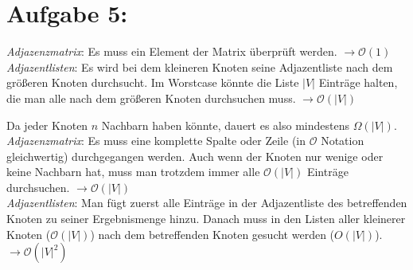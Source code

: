 \documentclass[11pt]{scrartcl} %
\begin{document}
\section*{Aufgabe 5:}
\begin{compactenum}[(a)]
\item
\emph{Adjazenzmatrix}: Es muss ein Element der Matrix überprüft werden. $\rightarrow \mathcal O(1)$\\[0.1cm]
\emph{Adjazentlisten}: Es wird bei dem kleineren Knoten seine Adjazentliste nach dem größeren Knoten durchsucht. Im Worstcase könnte die Liste $|V|$ Einträge halten, die man alle nach dem größeren Knoten durchsuchen muss. $\rightarrow \mathcal O(|V|)$\\
\item
Da jeder Knoten $n$ Nachbarn haben könnte, dauert es also mindestens $\Omega(|V|)$.\\[0.2cm]
\emph{Adjazenzmatrix}: Es muss eine komplette Spalte oder Zeile (in $\mathcal O$ Notation gleichwertig) durchgegangen werden. Auch wenn der Knoten nur wenige oder keine Nachbarn hat, muss man trotzdem immer alle $\mathcal O(|V|)$ Einträge durchsuchen. $\rightarrow \mathcal O(|V|)$\\[0.1cm]
\emph{Adjazentlisten}: Man fügt zuerst alle Einträge in der Adjazentliste des betreffenden Knoten zu seiner Ergebnismenge hinzu. Danach muss in den Listen aller kleinerer Knoten ($\mathcal O(|V|)$) nach dem betreffenden Knoten gesucht werden ($O(|V|)$). $\rightarrow \mathcal O(|V| ^2)$
\end{compactenum}
\end{document}
